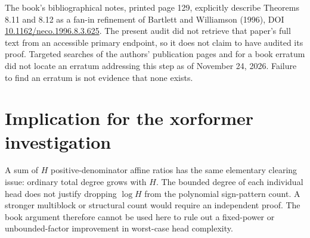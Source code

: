 \documentclass[11pt]{article}
\begin{document}
The book's bibliographical notes, printed page 129, explicitly describe
Theorems 8.11 and 8.12 as a fan-in refinement of Bartlett and Williamson
(1996), DOI \href{https://doi.org/10.1162/neco.1996.8.3.625}
{10.1162/neco.1996.8.3.625}. The present audit did not retrieve that paper's
full text from an accessible primary endpoint, so it does not claim to
have audited its proof. Targeted searches of the authors' publication
pages and for a book erratum did not locate an erratum addressing this
step as of November 24, 2026. Failure to find an erratum is not evidence
that none exists.

\section{Implication for the xorformer investigation}

A sum of $H$ positive-denominator affine ratios has the same elementary
clearing issue: ordinary total degree grows with $H$. The bounded degree
of each individual head does not justify dropping $\log H$ from the
polynomial sign-pattern count. A stronger multiblock or structural
count would require an independent proof. The book argument therefore
cannot be used here to rule out a fixed-power or unbounded-factor
improvement in worst-case head complexity.
\end{document}
